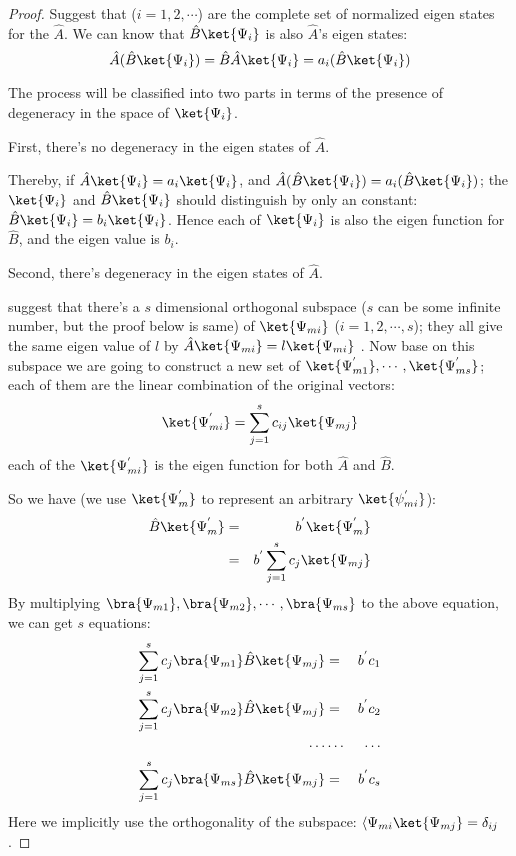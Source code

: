 \begin{proof}
Suggest that  ($i=1, 2, \cdots$) are the complete set
of normalized eigen states for the $\hat{A}$. We can know that
$\hat{B}\ket{\Psi_{i}}$ is also $\hat{A}$'s eigen states:
\begin{equation}\label{}
\hat{A}(\hat{B}\ket{\Psi_{i}}) = \hat{B}\hat{A}\ket{\Psi_{i}}
=a_{i}(\hat{B}\ket{\Psi_{i}})
\end{equation}

The process will be classified into two parts in terms of the
presence of degeneracy in the space of $\ket{\Psi_{i}}$.

First, there's no degeneracy in the eigen states of $\hat{A}$.

Thereby, if $\hat{A}\ket{\Psi_{i}} = a_{i}\ket{\Psi_{i}}$, and
$\hat{A}(\hat{B}\ket{\Psi_{i}}) = a_{i}(\hat{B}\ket{\Psi_{i}})$; the
$\ket{\Psi_{i}}$ and $\hat{B}\ket{\Psi_{i}}$ should distinguish by
only an constant: $\hat{B}\ket{\Psi_{i}} = b_{i}\ket{\Psi_{i}}$.
Hence each of $\ket{\Psi_{i}}$ is also the eigen function for
$\hat{B}$, and the eigen value is $b_{i}$.

Second, there's degeneracy in the eigen states of $\hat{A}$.

suggest that there's a $s$ dimensional orthogonal subspace ($s$ can
be some infinite number, but the proof below is same) of
$\ket{\Psi_{mi}}$ ($i=1, 2, \cdots, s$); they all give the same
eigen value of $l$ by $\hat{A}\ket{\Psi_{mi}} = l\ket{\Psi_{mi}}$ .
Now base on this subspace we are going to construct a new set of
$\ket{\Psi^{'}_{m1}}, \cdots, \ket{\Psi^{'}_{ms}}$; each of them are
the linear combination of the original vectors:
\begin{equation}\label{}
\ket{\Psi^{'}_{mi}} = \sum^{s}_{j=1}c_{ij}\ket{\Psi_{mj}}
\end{equation}
each of the $\ket{\Psi^{'}_{mi}}$ is the eigen function for both
$\hat{A}$ and $\hat{B}$.

So we have (we use $\ket{\Psi^{'}_{m}}$ to represent an arbitrary
$\ket{\psi^{'}_{mi}}$):
\begin{eqnarray}
  \hat{B} \ket{\Psi^{'}_{m}} &=& b^{'}\ket{\Psi^{'}_{m}} \nonumber \\
                             &=&b^{'} \sum^{s}_{j=1}c_{j}\ket{\Psi_{mj}}
\end{eqnarray}
By multiplying $\bra{\Psi_{m1}}, \bra{\Psi_{m2}}, \cdots,
\bra{\Psi_{ms}}$ to the above equation, we can get $s$ equations:
\begin{eqnarray}
  \sum^{s}_{j=1}c_{j} \bra{\Psi_{m1}}\hat{B}\ket{\Psi_{mj}} &=& b^{'}c_{1} \nonumber \\
  \sum^{s}_{j=1}c_{j} \bra{\Psi_{m2}}\hat{B}\ket{\Psi_{mj}} &=& b^{'}c_{2} \nonumber \\
  \cdots &\cdots& \cdots  \nonumber \\
  \sum^{s}_{j=1}c_{j} \bra{\Psi_{ms}}\hat{B}\ket{\Psi_{mj}} &=& b^{'}c_{s} \nonumber \\
\end{eqnarray}
Here we implicitly use the orthogonality of the subspace:
$\langle\Psi_{mi}\ket{\Psi_{mj}} = \delta _{ij}$.


\end{proof}

